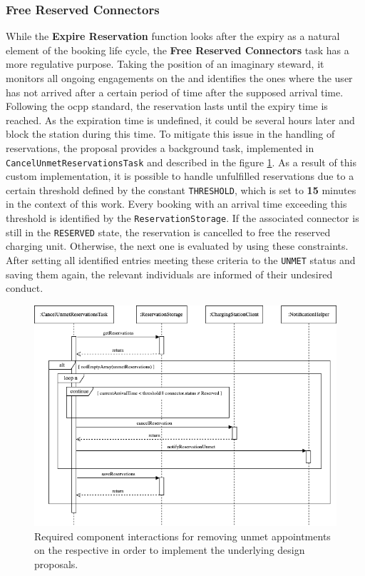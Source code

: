 \newpage

\subsubsection{Free Reserved Connectors}
\label{ch:Implementation:sec:Reservation System:ssec:Scheduling Capabilities:sssec:Free Reserved Connectors}

While the \textbf{Expire Reservation} function looks after the expiry as a natural element of the booking life cycle, the \textbf{Free Reserved Connectors} task has a more regulative purpose.
Taking the position of an imaginary steward, it monitors all ongoing engagements on the  and identifies the ones where the user has not arrived after a certain period of time after the supposed arrival time.
Following the \acrshort{ocpp} standard, the reservation lasts until the expiry time is reached. As the expiration time is undefined, it could be several hours later and block the station during this time. 
To mitigate this issue in the handling of reservations, the proposal provides a background task, implemented in \texttt{CancelUnmetReservationsTask} and described in the figure \ref{fig:free-connector-seqflow}.
As a result of this custom implementation, it is possible to handle unfulfilled reservations due to a certain threshold defined by the constant \texttt{THRESHOLD}, which is set to \textbf{15} minutes in the context of this work.
Every booking with an arrival time exceeding this threshold is identified by the \texttt{ReservationStorage}. If the associated connector is still in the \texttt{RESERVED} state, the reservation is cancelled to free the reserved charging unit.
Otherwise, the next one is evaluated by using these constraints.
After setting all identified entries meeting these criteria to the \texttt{UNMET} status and saving them again, the relevant individuals are informed of their undesired conduct.

\begin{figure}[h]
    \centering
    \includegraphics[scale=0.5]{resources/images/main/6_implementation/processes/scheduler/CancelUnmetReservation.png}
    \caption{Required component interactions for removing unmet appointments on the respective  in order to implement the underlying design proposals.}
    \label{fig:free-connector-seqflow}
\end{figure}


